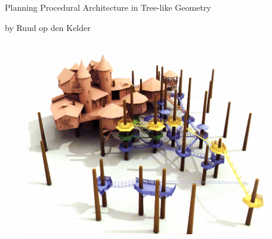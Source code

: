 
\begin{titlepage}
   
    	\begin{center}
    			\LARGE{Planning Procedural Architecture in Tree-like Geometry}
    	\end{center}
   	 	\begin{center}
    			by Ruud op den Kelder
    	\end{center}
    	
    	
    	
    	
\begin{figure}[htbp]
\centering
\includegraphics[width=400px]{images/titlepage_image.png}
\end{figure}
   
   
\end{titlepage} 